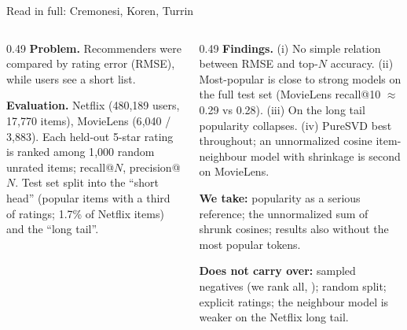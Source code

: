 \documentclass[aspectratio=169,10pt]{beamer}
\newcommand{\toindex}{\hfill\hyperlink{index}{\beamerreturnbutton{index}}}
\begin{document}
\begin{frame}[label=cremonesi]{Read in full: Cremonesi, Koren, Turrin \cite{cremonesi2010} \toindex}
  \footnotesize
  \begin{columns}[T]
    \begin{column}{0.49\textwidth}
      \textbf{Problem.} Recommenders were compared by rating error (RMSE), while users see a short list.
      \par\medskip
      \textbf{Evaluation.} Netflix (480{,}189 users, 17{,}770 items), MovieLens (6{,}040 / 3{,}883). Each held-out 5-star rating is ranked among 1{,}000 random unrated items; recall@$N$, precision@$N$. Test set split into the ``short head'' (popular items with a third of ratings; 1.7\% of Netflix items) and the ``long tail''.
    \end{column}
    \begin{column}{0.49\textwidth}
      \textbf{Findings.} (i) No simple relation between RMSE and top-$N$ accuracy. (ii) Most-popular is close to strong models on the full test set (MovieLens recall@10 $\approx$ 0.29 vs 0.28). (iii) On the long tail popularity collapses. (iv) PureSVD best throughout; an unnormalized cosine item-neighbour model with shrinkage is second on MovieLens.
      \par\medskip
      {\color{teal}\textbf{We take:}} popularity as a serious reference; the unnormalized sum of shrunk cosines; results also without the most popular tokens.
      \par\medskip
      {\color{orange}\textbf{Does not carry over:}} sampled negatives (we rank all, \cite{krichene2020}); random split; explicit ratings; the neighbour model is weaker on the Netflix long tail.
    \end{column}
  \end{columns}
\end{frame}
\end{document}
